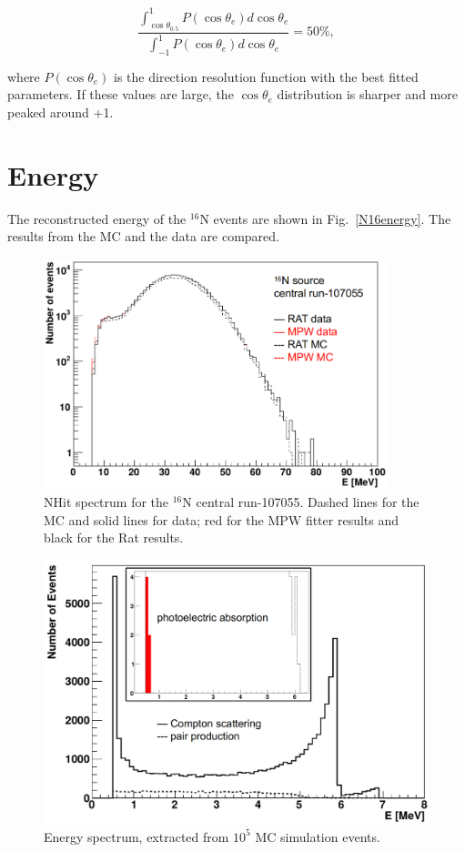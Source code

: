 \begin{equation}\label{eq:cosTheta_e}
\frac{\int_{\cos\theta_{0.5}}^1 P(\cos\theta_e) d\cos\theta_e}{\int_{-1}^1 P(\cos\theta_e) d\cos\theta_e} = 50\%,
\end{equation}

where $P(\cos\theta_e)$ is the direction resolution function with the best fitted parameters. If these values are large, the $\cos\theta_e$ distribution is sharper and more peaked around +1.




\section{Energy}

The reconstructed energy of the $^{16}$N events are shown in Fig.~\ref{N16energy}. The results from the MC and the data are compared.
\begin{figure}[htbp]
	\centering
	\includegraphics[width=10cm]{N16_nhits_107055.png}
	\caption{NHit spectrum for the $^{16}$N central run-107055. Dashed lines for the MC and solid lines for data; red for the MPW fitter results and black for the Rat results.}
	\label{N16nhits}
\end{figure}

\begin{figure}[htbp]
	\centering
	\includegraphics[width=12cm]{N16_MCenergySpectrum.png}
	\caption{Energy spectrum, extracted from $10^5$ MC simulation events.}
	\label{N16nhitsSimu}
\end{figure}


